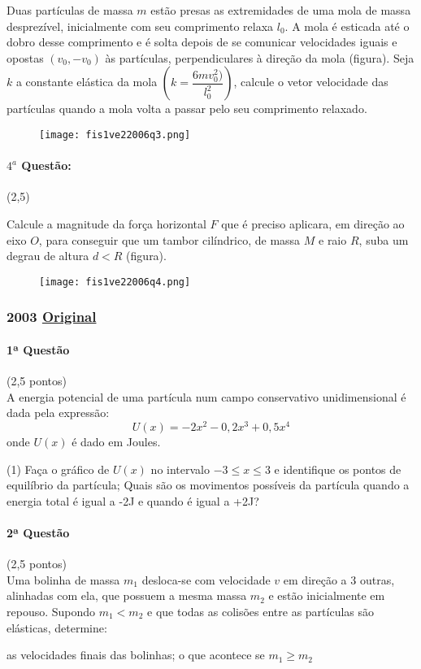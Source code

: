 \documentclass[12pt,a4paper]{article}
\newcommand{\original}[1]{\tiny \href{#1}{Original} \normalsize}
\begin{document}
Duas partículas de massa $m$ estão presas as extremidades de uma mola de massa desprezível, inicialmente com seu comprimento
relaxa $l_0$. A mola é esticada até o dobro desse comprimento e é solta depois de se comunicar velocidades iguais e opostas $(v_0,-v_0)$
às partículas, perpendiculares à direção da mola (figura). Seja $k$ a constante elástica da mola $(k=\dfrac{6mv^2_0)}{l^2_0})$,
calcule o vetor velocidade das partículas quando a mola volta a passar pelo seu comprimento relaxado.

\begin{figure}[ht]
\centering
\texttt{[image: fis1ve22006q3.png]}
\end{figure}

\paragraph{$4^a$ Questão:} (2,5)

Calcule a magnitude da força horizontal $F$ que é preciso aplicara, em direção ao eixo $O$, para conseguir que um tambor cilíndrico, de massa $M$
e raio $R$, suba um degrau de altura $d<R$ (figura).

\begin{figure}[ht]
\centering
\texttt{[image: fis1ve22006q4.png]}
\end{figure}

\newpage

\subsubsection{2003 \original{https://drive.google.com/open?id=122rY8tzBP2B_I6_SMNqJgFQrQlNd2R1E}}

\paragraph{1ª Questão} (2,5 pontos)\\
A energia potencial de uma partícula num campo conservativo unidimensional é dada pela expressão:$$U(x) = -2x^2 - 0,2x^3 + 0,5x^4$$onde $U(x)$ é dado em Joules.
\begin{tasks}(1)
\task Faça o gráfico de $U(x)$ no intervalo $-3 \le x \le 3$ e identifique os pontos de equilíbrio da partícula;
\task Quais são os movimentos possíveis da partícula quando a energia total é igual a -2J e quando é igual a +2J?
\end{tasks}

\paragraph{2ª Questão} (2,5 pontos)\\
Uma bolinha de massa $m_1$ desloca-se com velocidade $v$ em direção a 3 outras, alinhadas com ela, que possuem a mesma massa $m_2$ e estão inicialmente em repouso. Supondo $m_1 < m_2$ e que todas as colisões entre as partículas são elásticas, determine:
\begin{tasks}
\task as velocidades finais das bolinhas;
\task o que acontece se $m_1 \ge m_2$
\end{tasks}
\end{document}
